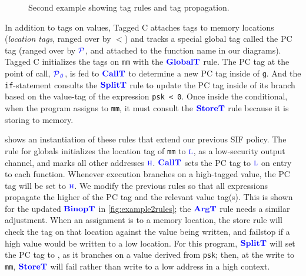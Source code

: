 \documentclass{llncs}
\begin{document}
\begin{figure}[t]
\caption{Second example showing tag rules and tag propagation.}
\label{fig:ex2}
\end{figure}

In addition to tags on values, Tagged C attaches tags to memory locations ({\em location tags}, ranged over by
\(\lt\)) and tracks a special global tag called the PC tag (ranged over by \(\PCT\), and attached to the
function name in our diagrams).
Tagged C initializes the tags on {\tt mm} with the \(\globaltname\) rule. The PC tag
at the point of call, \(\PCT[_0]\), is fed to \(\calltname\) to determine a new PC tag
inside of {\tt g}.
And the {\tt if}-statement consults the \(\splittname\) rule to update the PC tag
inside of its branch based on the value-tag of the expression {\tt psk < 0}. Once inside the
conditional, when the program assigns to {\tt mm}, it must consult the \(\storetname\) rule because
it is storing to memory.%

 shows an instantiation of these rules that extend our previous SIF policy.
The rule for globals initializes the location tag of {\tt mm} to \(\low\),
as a low-security output channel, and marks all other addresses \(\high\).
\(\calltname\) sets the PC tag to \(\low\) on entry to each function.
Whenever execution branches on
a high-tagged value, the PC tag will be set to \(\high\). We modify the previous rules so that
all expressions propagate the higher of the PC tag and the relevant value tag(s). This is shown
for the updated \(\binoptname\) in \cref{fig:example2rules}; the \(\argtname\) rule needs a similar
adjustment.
When an assignment is to a memory location, the store rule will check the tag on
that location against the value being written, 
and failstop if a high value would be written to a low location.
For this program, \(\splittname\) will set the PC tag to \high, as it branches on a value derived
from {\tt psk}; 
then, at the write to {\tt mm}, \(\storetname\) will fail rather than write to a low address
in a high context.
\end{document}
